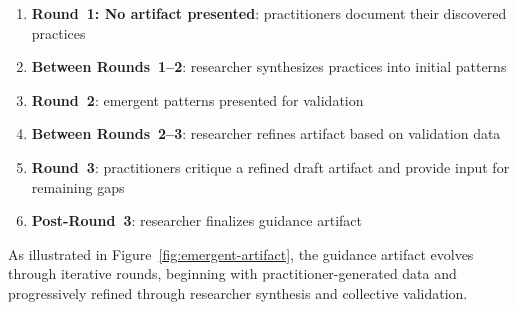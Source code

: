 \begin{enumerate}
    \item \textbf{Round~1: No artifact presented}: practitioners document their
          discovered practices
    \item \textbf{Between Rounds~1--2}: researcher synthesizes practices into
          initial patterns
    \item \textbf{Round~2}: emergent patterns presented for validation
    \item \textbf{Between Rounds~2--3}: researcher refines artifact based on
          validation data
    \item \textbf{Round~3}: practitioners critique a refined draft artifact and
          provide input for remaining gaps
    \item \textbf{Post-Round~3}: researcher finalizes guidance artifact
\end{enumerate}

As illustrated in Figure~\ref{fig:emergent-artifact}, the guidance artifact
evolves through iterative rounds, beginning with practitioner-generated data
and progressively refined through researcher synthesis and collective
validation.

